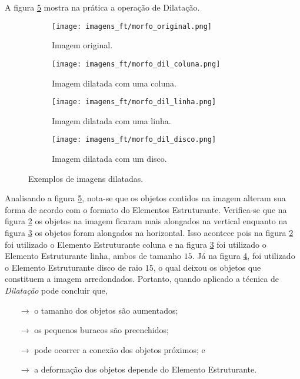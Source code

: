 A figura \ref{fig:dilatacao} mostra na prática a operação de Dilatação.

\begin{figure}[h]
	\centering
	\begin{subfigure}[b]{0.4\textwidth}
		\centering
		\texttt{[image: imagens\_ft/morfo\_original.png]}
		\caption{Imagem original.}
		\label{fig:original1}
	\end{subfigure}
	\hfill
	\begin{subfigure}[b]{0.4\textwidth}
		\centering
		\texttt{[image: imagens\_ft/morfo\_dil\_coluna.png]}
		\caption{Imagem dilatada com uma coluna.}
		\label{fig:dil_coluna}
	\end{subfigure}
	\hfill
	\begin{subfigure}[b]{0.4\textwidth}
		\centering
		\texttt{[image: imagens\_ft/morfo\_dil\_linha.png]}
		\caption{Imagem dilatada com uma linha.}
		\label{fig:dil_linha}
	\end{subfigure}
	\hfill
	\begin{subfigure}[b]{0.4\textwidth}
		\centering
		\texttt{[image: imagens\_ft/morfo\_dil\_disco.png]}
		\caption{Imagem dilatada com um disco.}
		\label{fig:dil_disco}
	\end{subfigure}
	\caption{Exemplos de imagens dilatadas.}
	\label{fig:dilatacao}
\end{figure}

Analisando a figura \ref{fig:dilatacao}, nota-se que os objetos contidos na imagem alteram sua forma de acordo com o formato do Elementos Estruturante. Verifica-se que na figura \ref{fig:dil_coluna} os objetos na imagem ficaram mais alongados na vertical enquanto na figura \ref{fig:dil_linha} os objetos foram alongados na horizontal. Isso acontece pois na figura \ref{fig:dil_coluna} foi utilizado o Elemento Estruturante coluna e na figura \ref{fig:dil_linha} foi utilizado o Elemento Estruturante linha, ambos de tamanho $15$. Já na figura \ref{fig:dil_disco}, foi utilizado o Elemento Estruturante disco de raio $15$, o qual deixou os objetos que constituem a imagem arredondados. Portanto, quando aplicado a técnica de \textit{Dilatação} pode concluir que,

\begin{itemize}
	\item[$\rightarrow$] o tamanho dos objetos são aumentados;
	\item[$\rightarrow$] os pequenos buracos são preenchidos; 
	\item[$\rightarrow$] pode ocorrer a conexão dos objetos próximos; e
	\item[$\rightarrow$] a deformação dos objetos depende do Elemento Estruturante.
\end{itemize}

